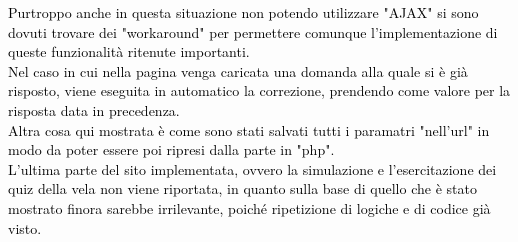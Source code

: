 \textcolor{black}{Purtroppo anche in questa situazione non potendo utilizzare "AJAX" si sono dovuti trovare dei "workaround" per permettere comunque l'implementazione di queste funzionalità ritenute importanti.\\
Nel caso in cui nella pagina venga caricata una domanda alla quale si è già risposto, viene eseguita in automatico la correzione, prendendo come valore per la risposta data in precedenza.\\
Altra cosa qui mostrata è come sono stati salvati tutti i paramatri "nell'url" in modo da poter essere poi ripresi dalla parte in "php".}\\
\bigskip
\textcolor{black}{L'ultima parte del sito implementata, ovvero la simulazione e l'esercitazione dei quiz della vela non viene riportata, in quanto sulla base di quello che è stato mostrato finora sarebbe irrilevante, poiché ripetizione di logiche e di codice già visto.} 